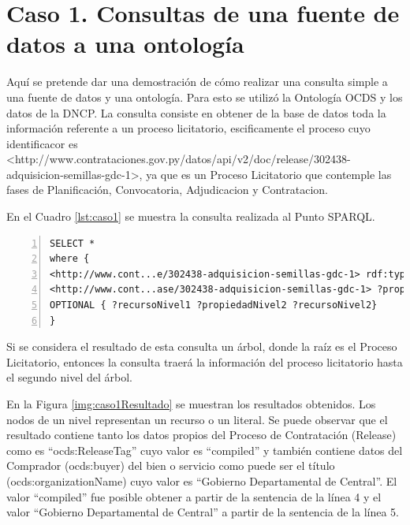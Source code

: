 \section{Caso 1. Consultas de una fuente de datos a una ontología}


Aquí se pretende dar una demostración de cómo realizar una consulta simple a una fuente de datos y una ontología. Para esto se utilizó la Ontología OCDS y los datos de la DNCP. La consulta consiste en obtener de la base de datos toda la información referente a un proceso licitatorio, escificamente el proceso cuyo identificacor es <http://www.contrataciones.gov.py/datos/api/v2/doc/release/302438-adquisicion-semillas-gdc-1>, ya que es un Proceso Licitatorio que contemple las fases de Planificación, Convocatoria, Adjudicacion y Contratacion.

En el Cuadro \ref{lst:caso1} se muestra la consulta realizada al Punto SPARQL.

\noindent\begin{minipage}[t]{\textwidth}
\begin{lstlisting}[captionpos=b, caption={Tripas referente al proceso licitatorio cuyo identificacor es 302438}, label={lst:caso1},  numbers=left,  numberstyle=\tiny\color{mygray},
    basicstyle=\footnotesize\ttfamily,frame=single]
SELECT *  
where {    	
<http://www.cont...e/302438-adquisicion-semillas-gdc-1> rdf:type ocds:Release .
<http://www.cont...ase/302438-adquisicion-semillas-gdc-1> ?propiedadNivel1 ?recursoNivel1 .   
OPTIONAL { ?recursoNivel1 ?propiedadNivel2 ?recursoNivel2}
}  
 \end{lstlisting}
\end{minipage}

 Si se considera el resultado de esta consulta un árbol, donde la raíz es el Proceso Licitatorio, entonces la consulta traerá la información del proceso licitatorio hasta el segundo nivel del árbol.

En la Figura \ref{img:caso1Resultado} se muestran los resultados obtenidos. Los nodos de un nivel representan un recurso o un literal. Se puede observar que el resultado contiene tanto los datos propios del Proceso de Contratación (Release) como es “ocds:ReleaseTag” cuyo valor es “compiled” y también contiene datos del Comprador (ocds:buyer) del bien o servicio como puede ser el título (ocds:organizationName) cuyo valor es “Gobierno Departamental de Central”. El valor “compiled” fue posible obtener a partir de la sentencia de la línea 4 y el valor “Gobierno Departamental de Central” a partir de la sentencia de la línea 5.

